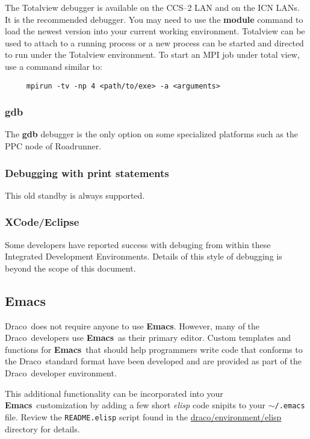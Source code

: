 \documentclass[11pt]{nmemo}
\newcommand{\comp}[1]{\normalfont\footnotesize\texttt{#1}\normalsize}
\newcommand{\draco}{{\normalfont\sffamily Draco}}
\newcommand{\emacs}{{\normalfont\bfseries Emacs}}
\begin{document}
The Totalview debugger is available on the CCS--2 LAN and on the ICN
LANs.  It is the recommended debugger.  You may need to use the
\textbf{module} command to load the newest version into your current
working environment.  Totalview can be used to attach to a running
process or a new process can be started and directed to run under the
Totalview environment.  To start an MPI job under total view, use a
command similar to:
\footnotesize
\begin{verbatim}
     mpirun -tv -np 4 <path/to/exe> -a <arguments>
\end{verbatim}
\normalsize

\subsubsection{gdb}

The \textbf{gdb} debugger is the only option on some specialized
platforms such as the PPC node of Roadrunner.

\subsubsection{Debugging with print statements}

This old standby is always supported.

\subsubsection{XCode/Eclipse}

Some developers have reported success with debuging from within these
Integrated Development Environments.  Details of this style of
debugging is beyond the scope of this document.

\subsection{\emacs}

\draco\ does not require anyone to use \emacs.  However, many of the
\draco\ developers use \emacs\ as their primary editor.  Custom
templates and functions for \emacs\ that should help programmers write
code that conforms to the \draco\ standard format have been developed
and are provided as part of the \draco\ developer environment.

This additional functionality can be incorporated into your \emacs\ 
customization by adding a few short \emph{elisp} code snipits to your
\comp{$\sim$/.emacs} file. Review the \comp{README.elisp} script
found in the \url{draco/environment/elisp} directory for details.
\end{document}

